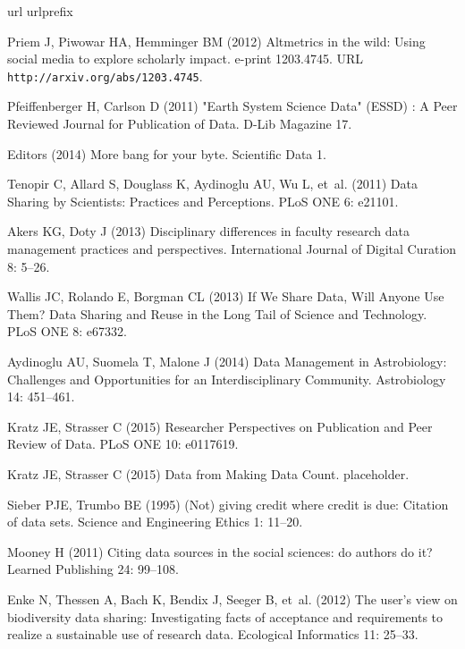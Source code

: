 \documentclass[english]{article}
\begin{document}
\begin{thebibliography}{1}
\expandafter\ifx\csname url\endcsname\relax
  \def\url#1{\texttt{#1}}\fi
\expandafter\ifx\csname urlprefix\endcsname\relax\def\urlprefix{URL }\fi
\providecommand{\bibinfo}[2]{#2}
\providecommand{\eprint}[2][]{\url{#2}}

Priem J, Piwowar HA, Hemminger BM (2012) Altmetrics in the wild: {Using} social
  media to explore scholarly impact.
 e-print 1203.4745.
\newblock \urlprefix\url{http://arxiv.org/abs/1203.4745}.

Pfeiffenberger H, Carlson D (2011) "{Earth} {System} {Science} {Data}" ({ESSD})
  : {A} {Peer} {Reviewed} {Journal} for {Publication} of {Data}.
\newblock D-Lib Magazine 17.

{Editors} (2014) More bang for your byte.
\newblock Scientific Data 1.

Tenopir C, Allard S, Douglass K, Aydinoglu AU, Wu L, et~al. (2011) Data
  {Sharing} by {Scientists}: {Practices} and {Perceptions}.
\newblock PLoS ONE 6: e21101.

Akers KG, Doty J (2013) Disciplinary differences in faculty research data
  management practices and perspectives.
\newblock International Journal of Digital Curation 8: 5--26.

Wallis JC, Rolando E, Borgman CL (2013) If {We} {Share} {Data}, {Will} {Anyone}
  {Use} {Them}? {Data} {Sharing} and {Reuse} in the {Long} {Tail} of {Science}
  and {Technology}.
\newblock PLoS ONE 8: e67332.

Aydinoglu AU, Suomela T, Malone J (2014) Data {Management} in {Astrobiology}:
  {Challenges} and {Opportunities} for an {Interdisciplinary} {Community}.
\newblock Astrobiology 14: 451--461.

Kratz JE, Strasser C (2015) Researcher {Perspectives} on {Publication} and
  {Peer} {Review} of {Data}.
\newblock PLoS ONE 10: e0117619.

Kratz JE, Strasser C (2015) Data from Making Data Count.
\newblock placeholder.

Sieber PJE, Trumbo BE (1995) ({Not}) giving credit where credit is due:
  {Citation} of data sets.
\newblock Science and Engineering Ethics 1: 11--20.

Mooney H (2011) Citing data sources in the social sciences: do authors do it?
\newblock Learned Publishing 24: 99--108.

Enke N, Thessen A, Bach K, Bendix J, Seeger B, et~al. (2012) The user's view on
  biodiversity data sharing: {Investigating} facts of acceptance and
  requirements to realize a sustainable use of research data.
\newblock Ecological Informatics 11: 25--33.

\end{thebibliography}

%
\end{document}
